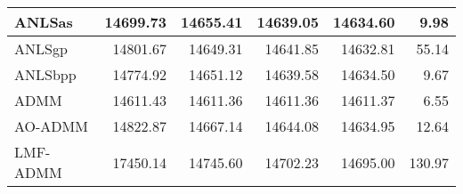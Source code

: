 \documentclass{article}
\begin{document}
\begin{table}[H]
\begin{tabular}{|l|r|r|r|r|r|}
		ANLSas   & 14699.73                & 14655.41                & 14639.05                 & 14634.60                 & 9.98                         \\ \hline
		ANLSgp   & 14801.67                & 14649.31                & 14641.85                 & 14632.81                 & 55.14                        \\ \hline
		ANLSbpp  & 14774.92                & 14651.12                & 14639.58                 & 14634.50                 & 9.67                         \\ \hline
		ADMM     & 14611.43                & 14611.36                & 14611.36                 & 14611.37                 & 6.55                         \\ \hline
		AO-ADMM  & 14822.87                & 14667.14                & 14644.08                 & 14634.95                 & 12.64                        \\ \hline
		LMF-ADMM & 17450.14                & 14745.60                & 14702.23                 & 14695.00                 & 130.97                       \\ \hline
	\end{tabular}
\end{table}
\end{document}
